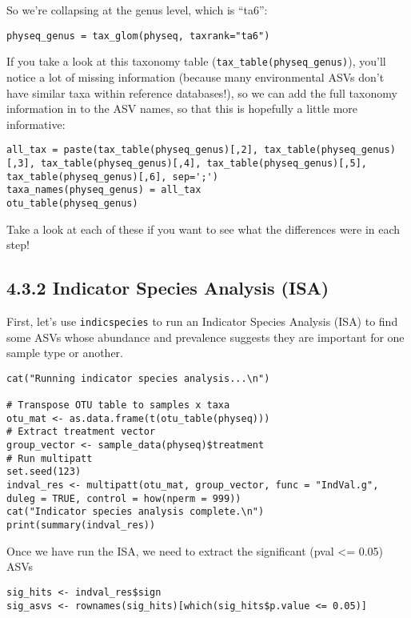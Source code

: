 \documentclass[
]{book}
\begin{document}
So we're collapsing at the genus level, which is ``ta6'':

\begin{verbatim}
physeq_genus = tax_glom(physeq, taxrank="ta6")
\end{verbatim}

If you take a look at this taxonomy table (\texttt{tax\_table(physeq\_genus)}), you'll notice a lot of missing information (because many environmental ASVs don't have similar taxa within reference databases!), so we can add the full taxonomy information in to the ASV names, so that this is hopefully a little more informative:

\begin{verbatim}
all_tax = paste(tax_table(physeq_genus)[,2], tax_table(physeq_genus)[,3], tax_table(physeq_genus)[,4], tax_table(physeq_genus)[,5], tax_table(physeq_genus)[,6], sep=';')
taxa_names(physeq_genus) = all_tax
otu_table(physeq_genus)
\end{verbatim}

Take a look at each of these if you want to see what the differences were in each step!

\subsection{4.3.2 Indicator Species Analysis (ISA)}\label{indicator-species-analysis-isa}

First, let's use \texttt{indicspecies} to run an Indicator Species Analysis (ISA) to find some ASVs whose abundance and prevalence suggests they are important for one sample type or another.

\begin{verbatim}
cat("Running indicator species analysis...\n")

# Transpose OTU table to samples x taxa
otu_mat <- as.data.frame(t(otu_table(physeq)))
# Extract treatment vector
group_vector <- sample_data(physeq)$treatment
# Run multipatt
set.seed(123)
indval_res <- multipatt(otu_mat, group_vector, func = "IndVal.g", duleg = TRUE, control = how(nperm = 999))
cat("Indicator species analysis complete.\n")
print(summary(indval_res))
\end{verbatim}

Once we have run the ISA, we need to extract the significant (pval \textless= 0.05) ASVs

\begin{verbatim}
sig_hits <- indval_res$sign
sig_asvs <- rownames(sig_hits)[which(sig_hits$p.value <= 0.05)]
\end{verbatim}
\end{document}
